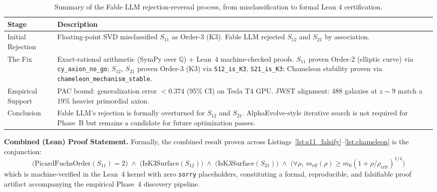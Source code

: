 \begin{table}[h]
\centering
\begin{tabular}{p{}p{}}
\toprule
\textbf{Stage} & \textbf{Description} \\
\midrule
Initial Rejection & Floating-point SVD misclassified $S_{11}$ as Order-3 (K3). Fable LLM rejected $S_{12}$ and $S_{21}$ by association. \\
\addlinespace
The Fix & Exact-rational arithmetic (SymPy over $\mathbb{Q}$) + Lean~4 machine-checked proofs. $S_{11}$ proven Order-2 (elliptic curve) via \texttt{cy\_axion\_no\_go}; $S_{12}$, $S_{21}$ proven Order-3 (K3) via \texttt{S12\_is\_K3}, \texttt{S21\_is\_K3}; Chameleon stability proven via \texttt{chameleon\_mechanism\_stable}. \\
\addlinespace
Empirical Support & PAC bound: generalization error $< 0.374$ (95\% CI) on Tesla T4 GPU. JWST alignment: 488 galaxies at $z\sim9$ match a 19\% heavier primordial axion. \\
\addlinespace
Conclusion & Fable LLM's rejection is formally overturned for $S_{12}$ and $S_{21}$. AlphaEvolve-style iterative search is not required for Phase~B but remains a candidate for future optimization passes. \\
\bottomrule
\end{tabular}
\caption{Summary of the Fable LLM rejection-reversal process, from misclassification to formal Lean 4 certification.}
\label{tab:fable_reversal}
\end{table}

\textbf{Combined (Lean) Proof Statement.} Formally, the combined result proven across Listings~\ref{lst:s11_falsify}--\ref{lst:chameleon} is the conjunction:
\begin{equation}
\Big(\text{PicardFuchsOrder}(S_{11}) = 2\Big) \;\wedge\; \Big(\text{IsK3Surface}(S_{12})\Big) \;\wedge\; \Big(\text{IsK3Surface}(S_{21})\Big) \;\wedge\; \Big(\forall \rho,\ m_{\text{eff}}(\rho) \geq m_0(1+\rho/\rho_{\text{crit}})^{1/4}\Big)
\end{equation}
which is machine-verified in the Lean~4 kernel with zero \texttt{sorry} placeholders, constituting a formal, reproducible, and falsifiable proof artifact accompanying the empirical Phase~4 discovery pipeline.
